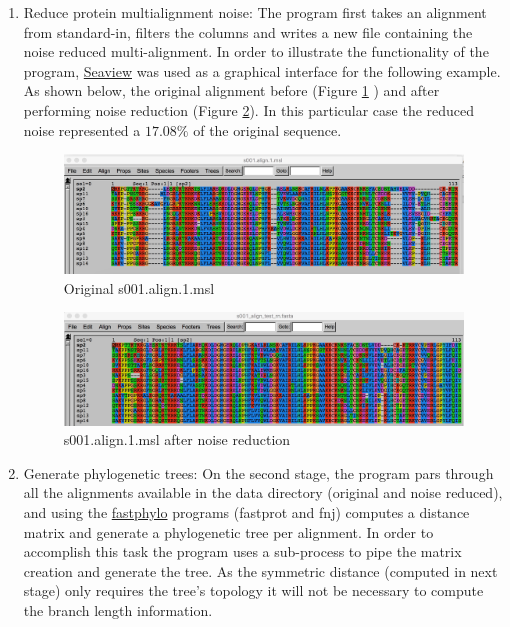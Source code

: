 \documentclass[12pt]{article}
\begin{document}
\begin{enumerate}
	\item Reduce protein multialignment noise: 
The program first takes an alignment from standard-in, filters the columns and writes a new file containing the noise reduced multi-alignment. 
In order to illustrate the functionality of the program,   \href{http://doua.prabi.fr/software/seaview}{Seaview} was used as a graphical interface for the following example.\\

 As shown below, the original alignment before (Figure \ref{fig:al_1} ) and after performing noise reduction (Figure \ref{fig:al_2}). In this particular case the reduced noise  represented a $17.08\%$ of the original sequence.

\begin{figure}[H]
	\includegraphics[width=\linewidth]{labnotes2.png}
	\caption{Original s001.align.1.msl}
	\label{fig:al_1}
\end{figure}

\begin{figure}[H]
	\includegraphics[width=\linewidth]{labnotes_1.png}
	\caption{s001.align.1.msl after noise reduction}
	\label{fig:al_2}
\end{figure}
	
	\item Generate phylogenetic trees:
 On the second stage, the program pars through all the alignments available in the data directory (original and noise reduced), and using the  \href{http://fastphylo.sourceforge.net/}{fastphylo} programs (fastprot and fnj) computes a distance matrix and generate a phylogenetic tree per alignment. In order to accomplish this task the program uses a sub-process to pipe the matrix creation and generate the tree. As the symmetric distance (computed in next stage) only requires the tree's topology it will not be necessary to compute the branch length information.  \\
 

\end{enumerate}
\end{document}
